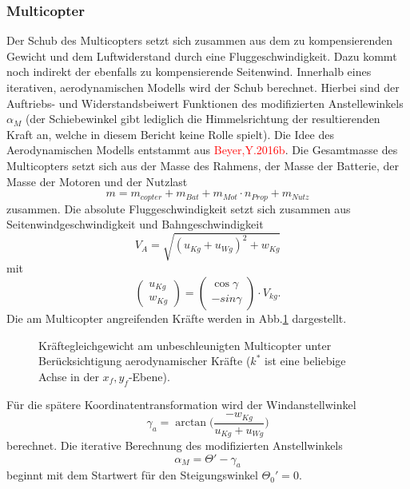 \subsubsection{Multicopter}
Der Schub des Multicopters setzt sich zusammen aus dem zu kompensierenden Gewicht und dem Luftwiderstand durch eine Fluggeschwindigkeit. Dazu kommt noch indirekt der ebenfalls zu kompensierende Seitenwind. Innerhalb eines iterativen, aerodynamischen Modells wird der Schub berechnet. Hierbei sind der Auftriebs- und Widerstandsbeiwert Funktionen des modifizierten Anstellewinkels \ensuremath{\alpha_M} (der Schiebewinkel gibt lediglich die Himmelsrichtung der resultierenden Kraft an, welche in diesem Bericht keine Rolle spielt). Die Idee des Aerodynamischen Modells entstammt aus \textcolor{red}{Beyer,Y.2016b}. 
Die Gesamtmasse des Multicopters setzt sich aus der Masse des Rahmens, der Masse der Batterie, der Masse der Motoren und der Nutzlast
\begin{equation}
	m = m_{copter}+m_{Bat}+m_{Mot}\cdot n_{Prop}+m_{Nutz}
\end{equation}
zusammen.
Die absolute Fluggeschwindigkeit setzt sich zusammen aus Seitenwindgeschwindigkeit und Bahngeschwindigkeit
\begin{equation}
	V_A = \sqrt{(u_{Kg} + u_{Wg})^2+w_{Kg}}
\end{equation}
mit
\begin{equation}
	\begin{pmatrix} u_{Kg} \\ w_{Kg} \end{pmatrix} = \begin{pmatrix}
	\cos\gamma \\ -sin{\gamma}	\end{pmatrix} \cdot V_{kg}.
\end{equation}
Die am Multicopter angreifenden Kräfte werden in Abb.\ref{abb:kraefteggw} dargestellt. 

\begin{figure}[H]
\centering
\begin{small}
	
	\end{small}
	\caption{Kräftegleichgewicht am unbeschleunigten Multicopter unter Berücksichtigung aerodynamischer Kräfte ($k^*$ ist eine beliebige Achse in der $x_f,y_f$-Ebene).}
	\label{abb:kraefteggw}
\end{figure}

Für die spätere Koordinatentransformation wird der Windanstellwinkel
\begin{equation}
	\gamma_a = \arctan \Big(\frac{-w_{Kg}}{u_{Kg}+u_{Wg}}\Big)
\end{equation}
berechnet.
Die iterative Berechnung des modifizierten Anstellwinkels 
\begin{equation}
	\alpha_M = \Theta '-\gamma_a
\end{equation} 
beginnt mit dem Startwert für den Steigungswinkel \ensuremath{\Theta_0'=0}.

